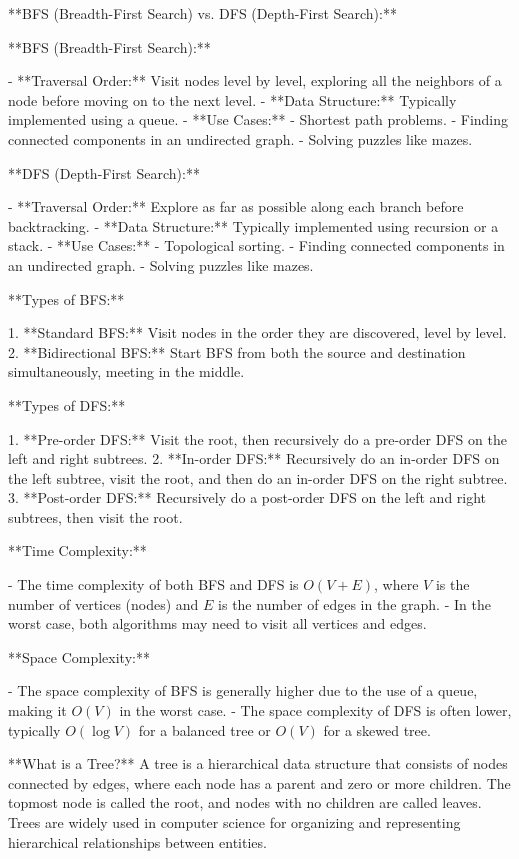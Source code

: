 **BFS (Breadth-First Search) vs. DFS (Depth-First Search):**

**BFS (Breadth-First Search):**

- **Traversal Order:** Visit nodes level by level, exploring all the neighbors of a node before moving on to the next level.
- **Data Structure:** Typically implemented using a queue.
- **Use Cases:**
    - Shortest path problems.
    - Finding connected components in an undirected graph.
    - Solving puzzles like mazes.

**DFS (Depth-First Search):**

- **Traversal Order:** Explore as far as possible along each branch before backtracking.
- **Data Structure:** Typically implemented using recursion or a stack.
- **Use Cases:**
    - Topological sorting.
    - Finding connected components in an undirected graph.
    - Solving puzzles like mazes.

**Types of BFS:**

1. **Standard BFS:** Visit nodes in the order they are discovered, level by level.
2. **Bidirectional BFS:** Start BFS from both the source and destination simultaneously, meeting in the middle.

**Types of DFS:**

1. **Pre-order DFS:** Visit the root, then recursively do a pre-order DFS on the left and right subtrees.
2. **In-order DFS:** Recursively do an in-order DFS on the left subtree, visit the root, and then do an in-order DFS on the right subtree.
3. **Post-order DFS:** Recursively do a post-order DFS on the left and right subtrees, then visit the root.

**Time Complexity:**

- The time complexity of both BFS and DFS is \(O(V + E)\), where \(V\) is the number of vertices (nodes) and \(E\) is the number of edges in the graph.
- In the worst case, both algorithms may need to visit all vertices and edges.

**Space Complexity:**

- The space complexity of BFS is generally higher due to the use of a queue, making it \(O(V)\) in the worst case.
- The space complexity of DFS is often lower, typically \(O(\log V)\) for a balanced tree or \(O(V)\) for a skewed tree.

**What is a Tree?**
A tree is a hierarchical data structure that consists of nodes connected by edges, where each node has a parent and zero or more children. The topmost node is called the root, and nodes with no children are called leaves. Trees are widely used in computer science for organizing and representing hierarchical relationships between entities.

